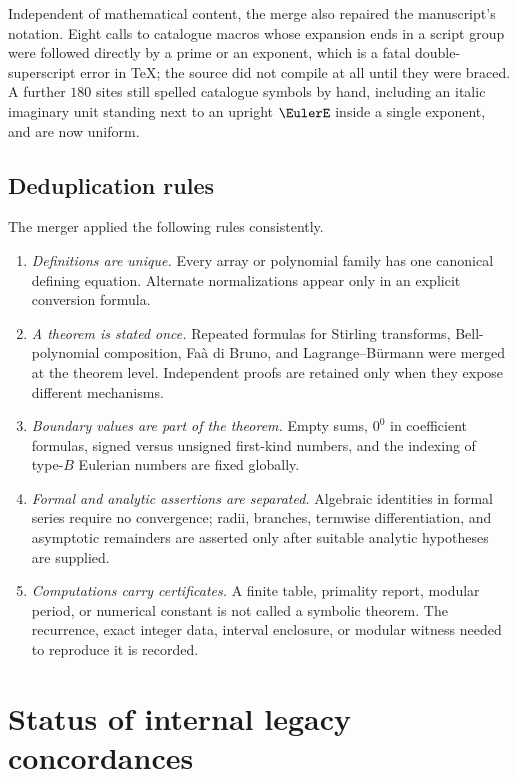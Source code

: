 \documentclass[11pt,a4paper,oneside,openany]{book}
\theoremstyle{definition}
\theoremstyle{remark}
\begin{document}
Independent of mathematical content, the merge also repaired the manuscript's
notation.  Eight calls to catalogue macros whose expansion ends in a script
group were followed directly by a prime or an exponent, which is a fatal
double-superscript error in \TeX; the source did not compile at all until they
were braced.  A further $180$ sites still spelled catalogue symbols by hand,
including an italic imaginary unit standing next to an upright $\EulerE$ inside
a single exponent, and are now uniform.

\section{Deduplication rules}

The merger applied the following rules consistently.
\begin{enumerate}
\item \emph{Definitions are unique.}  Every array or polynomial family has one
      canonical defining equation.  Alternate normalizations appear only in an
      explicit conversion formula.
\item \emph{A theorem is stated once.}  Repeated formulas for Stirling transforms,
      Bell-polynomial composition, Fa\`a di Bruno, and Lagrange--B\"urmann were
      merged at the theorem level.  Independent proofs are retained only when they
      expose different mechanisms.
\item \emph{Boundary values are part of the theorem.}  Empty sums, $0^0$ in
      coefficient formulas, signed versus unsigned first-kind numbers, and the
      indexing of type-$B$ Eulerian numbers are fixed globally.
\item \emph{Formal and analytic assertions are separated.}  Algebraic identities
      in formal series require no convergence; radii, branches, termwise
      differentiation, and asymptotic remainders are asserted only after suitable
      analytic hypotheses are supplied.
\item \emph{Computations carry certificates.}  A finite table, primality report,
      modular period, or numerical constant is not called a symbolic theorem.
      The recurrence, exact integer data, interval enclosure, or modular witness
      needed to reproduce it is recorded.
\end{enumerate}

\chapter{Status of internal legacy concordances}
\label{ch:merged-reference-concordance}
\end{document}
